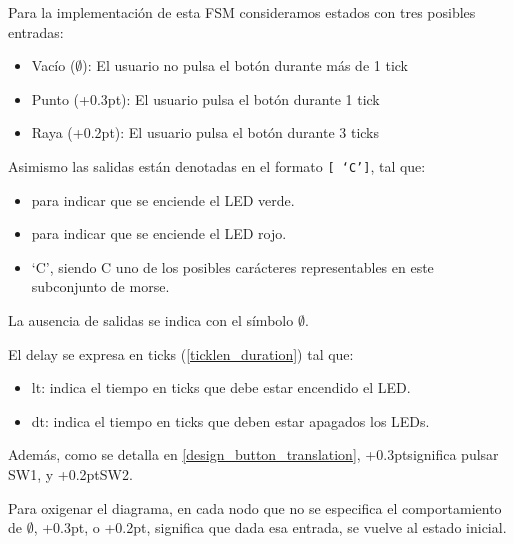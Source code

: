 \documentclass[a4paper,openright,12pt]{article}
\newcommand{\punto}{\kern+0.3pt\raisebox{0.35ex}{\huge\textbf.}}
\newcommand{\raya}{\kern+0.2pt\raisebox{-0.35ex}{\huge\textbf-}}
\begin{document}
Para la implementación de esta FSM consideramos estados con tres posibles entradas:
\begin{itemize}
    \item Vacío ($\emptyset$): El usuario no pulsa el botón durante más de 1 tick
    \item Punto (\punto): El usuario pulsa el botón durante 1 tick
    \item Raya (\raya): El usuario pulsa el botón durante 3 ticks
\end{itemize}

Asimismo las salidas están denotadas en el formato \texttt{[\text{\textcolor{green}{\punto}}\text{\textcolor{red}{\punto}} `C']}, tal que:
\begin{itemize}
    \item \text{\textcolor{green}{\punto}} para indicar que se enciende el LED verde.
    \item \text{\textcolor{red}{\punto}} para indicar que se enciende el LED rojo.
    \item `C', siendo C uno de los posibles carácteres representables en este subconjunto de morse.
\end{itemize}

La ausencia de salidas se indica con el símbolo $\emptyset$.
\bigskip

El delay se expresa en ticks (\ref{ticklen_duration}) tal que:
\begin{itemize}
    \item lt: indica el tiempo en ticks que debe estar encendido el LED.
    \item dt: indica el tiempo en ticks que deben estar apagados los LEDs.
\end{itemize}
\bigskip

Además, como se detalla en \ref{design_button_translation}, \punto \space significa pulsar SW1, y \raya \space SW2.
\bigskip

Para oxigenar el diagrama, en cada nodo que no se especifica el comportamiento de $\emptyset$, \punto, o \raya, significa que dada esa entrada, se vuelve al estado inicial.

\clearpage
\end{document}
